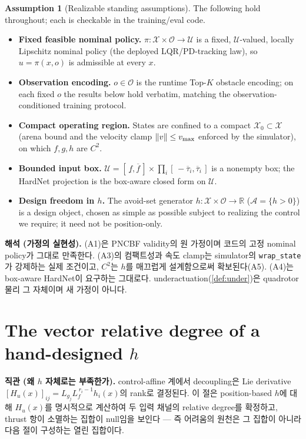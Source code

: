 \documentclass[11pt]{article}
\theoremstyle{plain}
\theoremstyle{definition}
\newtheorem{assumption}[theorem]{Assumption}
\theoremstyle{remark}
\newcommand{\R}{\mathbb{R}}
\DeclarePairedDelimiter{\norm}{\lVert}{\rVert}
\newcommand{\calX}{\mathcal{X}}
\newcommand{\calU}{\mathcal{U}}
\newcommand{\calA}{\mathcal{A}}
\newcommand{\calO}{\mathcal{O}}
\newcommand{\Lf}{L_f}
\newcommand{\Hu}{H_u}
\begin{document}
\begin{assumption}[Realizable standing assumptions]\label{asm:standing}
The following hold throughout; each is checkable in the training/eval code.
\begin{itemize}[leftmargin=1.8em]
  \item[\textbf{(A1)}] \textbf{Fixed feasible nominal policy.} $\pi:\calX\times\calO\to\calU$ is a fixed, $\calU$-valued, locally Lipschitz nominal policy (the deployed LQR/PD-tracking law), so $u=\pi(x,o)$ is admissible at every $x$.
  \item[\textbf{(A2)}] \textbf{Observation encoding.} $o\in\calO$ is the runtime Top-$K$ obstacle encoding; on each fixed $o$ the results below hold verbatim, matching the observation-conditioned training protocol.
  \item[\textbf{(A3)}] \textbf{Compact operating region.} States are confined to a compact $\calX_0\subset\calX$ (arena bound and the velocity clamp $\norm{v}\le v_{\max}$ enforced by the simulator), on which $f,g,h$ are $C^2$.
  \item[\textbf{(A4)}] \textbf{Bounded input box.} $\calU=[\,\underline f,\overline f\,]\times\prod_i[\,-\overline\tau_i,\overline\tau_i\,]$ is a nonempty box; the HardNet projection is the box-aware closed form on $\calU$.
  \item[\textbf{(A5)}] \textbf{Design freedom in $h$.} The avoid-set generator $h:\calX\times\calO\to\R$ ($\calA=\{h>0\}$) is a design object, chosen as simple as possible subject to realizing the control we require; it need not be position-only.
\end{itemize}
\end{assumption}

\textbf{해석 (가정의 실현성).}
(A1)은 PNCBF validity의 원 가정이며 코드의 고정 nominal policy가 그대로 만족한다. (A3)의 컴팩트성과
속도 clamp는 simulator의 \texttt{wrap\_state}가 강제하는 실제 조건이고, $C^2$는 $h$를 매끄럽게
설계함으로써 확보된다(A5). (A4)는 box-aware HardNet이 요구하는 그대로다.
underactuation(\cref{def:under})은 quadrotor 물리 그 자체이며 새 가정이 아니다.

\section{The vector relative degree of a hand-designed \texorpdfstring{$h$}{h}}\label{sec:relhu}

\textbf{직관 (왜 $h$ 자체로는 부족한가).}
control-affine 계에서 decoupling은 Lie derivative $[\Hu(x)]_{ij}=L_{g_j}\Lf^{\,r_i-1}h_i(x)$의
rank로 결정된다. 이 절은 position-based $h$에 대해 $\Hu(x)$를 명시적으로 계산하여 두 입력 채널의
relative degree를 확정하고, thrust 항이 소멸하는 집합이 null임을 보인다 --- 즉 어려움의 원천은 그
집합이 아니라 다음 절이 구성하는 열린 집합이다.
\end{document}
